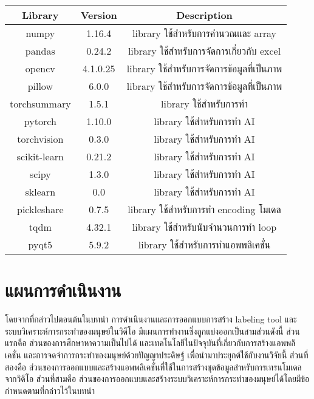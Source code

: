 \begin{tabular}{|c|c|c|}
		\hline
		{Library}&{Version}&{Description}\\
		\hline
		numpy	 			&  1.16.4		& library ใช้สำหรับการคำนวณและ array				\\
		pandas				& 0.24.2		& library ใช้สำหรับการจัดการเกี่ยวกับ excel				\\
		opencv			 	& 4.1.0.25		& library ใช้สำหรับการจัดการข้อมูลที่เป็นภาพ			\\
		pillow				& 6.0.0			& library ใช้สำหรับการจัดการข้อมูลที่เป็นภาพ			\\
		torchsummary		& 1.5.1			& library ใช้สำหรับการทำ 							\\
		pytorch		 		& 1.10.0		& library ใช้สำหรับการทำ AI							\\
		torchvision			& 0.3.0	 		& library ใช้สำหรับการทำ AI							\\
		scikit-learn		& 0.21.2		& library ใช้สำหรับการทำ AI							\\
		scipy				& 1.3.0			& library ใช้สำหรับการทำ AI							\\
		sklearn				& 0.0			& library ใช้สำหรับการทำ AI							\\
		pickleshare			& 0.7.5			& library ใช้สำหรับการทำ encoding โมเดล				\\
		tqdm				& 4.32.1		& library ใช้สำหรับนับจำนวนการทำ loop					\\
		pyqt5				& 5.9.2			& library ใช้สำหรับการทำแอพพลิเคชั่น					\\
		\hline
\end{tabular}



\vspace{3mm}
\section{แผนการดำเนินงาน}
โดยจากที่กล่าวไปตอนต้นในบทนำ
การดำเนินงานและการออกแบบการสร้าง labeling tool และระบบวิเคราะห์การกระทำของมนุษย์ในวิดีโอ มีแผนการทำงานซึ่งถูกแบ่งออกเป็นสามส่วนดังนี้ 
ส่วนแรกคือ ส่วนของการศึกษาหาความเป็นไปได้ และเทคโนโลยีในปัจจุบันที่เกี่ยวกับการสร้างแอพพลิเคชั่น และการจดจำการกระทำของมนุษย์ด้วยปัญญาประดิษฐ์ เพื่อนำมาประยุกต์ใช้กับงานวิจัยนี้
ส่วนที่สองคือ ส่วนของการออกแบบและสร้างแอพพลิเคชั่นที่ใช้ในการสร้างชุดข้อมูลสำหรับการเทรนโมเดลจากวิดีโอ
ส่วนที่สามคือ ส่วนของการออกแบบและสร้างระบบวิเคราะห์การกระทำของมนุษย์ได้โดยมีข้อกำหนดตามที่กล่าวไว้ในบทนำ

